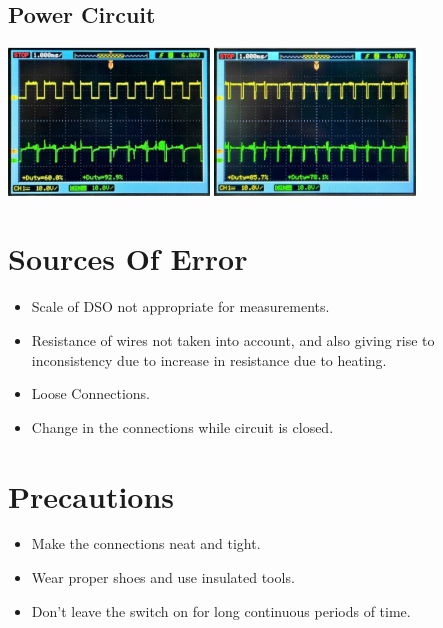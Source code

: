 \documentclass{article}
\begin{document}
\subsection{Power Circuit}
\begin{center}
    \includegraphics[width=0.4\textwidth]{pic7.png}\hspace{2mm}
    \includegraphics[width=0.4\textwidth]{pic8.png}\\
\end{center}

\section{Sources Of Error}
\begin{itemize}
    \item Scale of DSO not appropriate for measurements.
    \item Resistance of wires not taken into account, and also giving rise to inconsistency due to increase in resistance due to heating.
    \item Loose Connections.
    \item Change in the connections while circuit is closed.
\end{itemize}

\section{Precautions}
\begin{itemize}
    \item Make the connections neat and tight.
    \item Wear proper shoes and use insulated tools.
    \item Don’t leave the switch on for long continuous periods of time.
\end{itemize}
\end{document}
